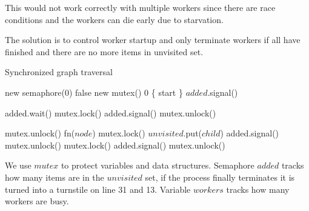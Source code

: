This would not work correctly with multiple workers since there are race conditions and the workers can die early due to starvation.

The solution is to control worker startup and only terminate workers if all have finished and there are no more items in unvisited set.

\begin{algorithm}[H]
    \caption{Synchronized graph traversal}
\begin{algorithmic}[1]

             {new semaphore(0)}
         {false}
             {new mutex()}
           {0}
         {\{ start \}}
        \State $added$.signal()
        
        \Spawn
                \State added.wait()
                \State mutex.lock()
                    \State added.signal()
                    \State mutex.unlock()
                \EndIf

                \State mutex.unlock()
                \Statex
                \State fn($node$)
                \Statex
                    \State mutex.lock()
                        \State $unvisited$.put($child$)
                        \State added.signal()
                    \EndIf
                    \State mutex.unlock()
                \EndFor
                \Statex
                \State mutex.lock()
                    \State added.signal()
                \EndIf
                \State mutex.unlock()
            \EndWhile
        \EndSpawn

    \EndFunction
\end{algorithmic}
\end{algorithm}

We use $mutex$ to protect variables and data structures. Semaphore $added$ tracks how many items are in the $unvisited$ set, if the process finally terminates it is turned into a turnstile on line 31 and 13. Variable $workers$ tracks how many workers are busy.

